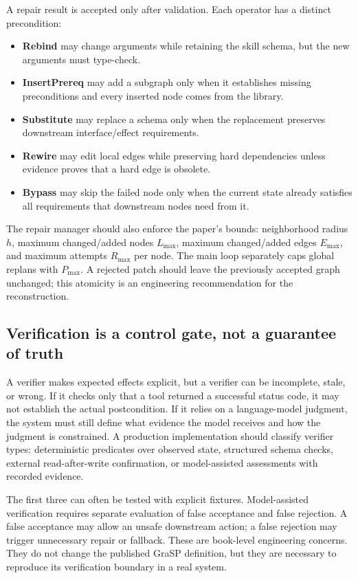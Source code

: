 A repair result is accepted only after validation. Each operator has a distinct precondition:

\begin{itemize}
  \item \textbf{Rebind} may change arguments while retaining the skill schema, but the new arguments must type-check.
  \item \textbf{InsertPrereq} may add a subgraph only when it establishes missing preconditions and every inserted node comes from the library.
  \item \textbf{Substitute} may replace a schema only when the replacement preserves downstream interface/effect requirements.
  \item \textbf{Rewire} may edit local edges while preserving hard dependencies unless evidence proves that a hard edge is obsolete.
  \item \textbf{Bypass} may skip the failed node only when the current state already satisfies all requirements that downstream nodes need from it.
\end{itemize}

The repair manager should also enforce the paper's bounds: neighborhood radius \(h\), maximum changed/added nodes \(L_{\max}\), maximum changed/added edges \(E_{\max}\), and maximum attempts \(R_{\max}\) per node. The main loop separately caps global replans with \(P_{\max}\). A rejected patch should leave the previously accepted graph unchanged; this atomicity is an engineering recommendation for the reconstruction.

\subsection{Verification is a control gate, not a guarantee of truth}

A verifier makes expected effects explicit, but a verifier can be incomplete, stale, or wrong. If it checks only that a tool returned a successful status code, it may not establish the actual postcondition. If it relies on a language-model judgment, the system must still define what evidence the model receives and how the judgment is constrained. A production implementation should classify verifier types: deterministic predicates over observed state, structured schema checks, external read-after-write confirmation, or model-assisted assessments with recorded evidence.

The first three can often be tested with explicit fixtures. Model-assisted verification requires separate evaluation of false acceptance and false rejection. A false acceptance may allow an unsafe downstream action; a false rejection may trigger unnecessary repair or fallback. These are book-level engineering concerns. They do not change the published GraSP definition, but they are necessary to reproduce its verification boundary in a real system.

